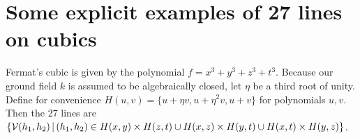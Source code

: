 \section{Some explicit examples of 27 lines on cubics}

\begin{example}
Fermat's cubic is given by the polynomial $f = x^3 + y^3 + z^3 + t^3$.
Because our ground field $k$ is assumed to be algebraically closed, let $\eta$ be a third root of unity.
Define for convenience $H(u,v) = \{ u+\eta v, u+\eta^2v, u+v \}$ for polynomials $u,v$.
Then the 27 lines are
$\left\lbrace \operatorname{\mathcal V}(h_1,h_2) \,|\,  (h_1,h_2) \in H(x,y)\times H(z,t) \cup H(x,z)\times H(y,t) \cup H(x,t)\times H(y,z)\right\rbrace$.
\end{example}

\begin{example}
\cite[p.332 ff.]{clebsch1871ueber}
\end{example}
